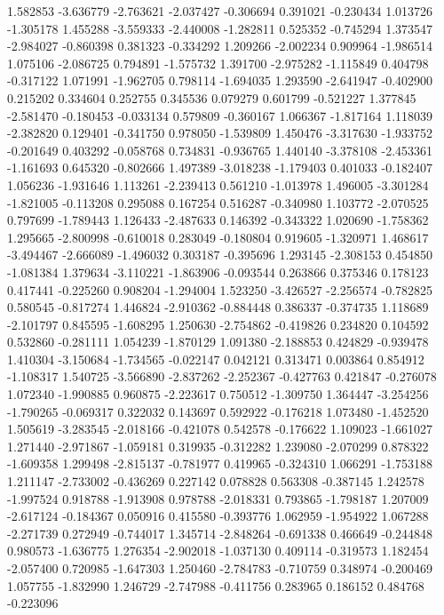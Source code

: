 1.582853
-3.636779
-2.763621
-2.037427
-0.306694
0.391021
-0.230434
1.013726
-1.305178
1.455288
-3.559333
-2.440008
-1.282811
0.525352
-0.745294
1.373547
-2.984027
-0.860398
0.381323
-0.334292
1.209266
-2.002234
0.909964
-1.986514
1.075106
-2.086725
0.794891
-1.575732
1.391700
-2.975282
-1.115849
0.404798
-0.317122
1.071991
-1.962705
0.798114
-1.694035
1.293590
-2.641947
-0.402900
0.215202
0.334604
0.252755
0.345536
0.079279
0.601799
-0.521227
1.377845
-2.581470
-0.180453
-0.033134
0.579809
-0.360167
1.066367
-1.817164
1.118039
-2.382820
0.129401
-0.341750
0.978050
-1.539809
1.450476
-3.317630
-1.933752
-0.201649
0.403292
-0.058768
0.734831
-0.936765
1.440140
-3.378108
-2.453361
-1.161693
0.645320
-0.802666
1.497389
-3.018238
-1.179403
0.401033
-0.182407
1.056236
-1.931646
1.113261
-2.239413
0.561210
-1.013978
1.496005
-3.301284
-1.821005
-0.113208
0.295088
0.167254
0.516287
-0.340980
1.103772
-2.070525
0.797699
-1.789443
1.126433
-2.487633
0.146392
-0.343322
1.020690
-1.758362
1.295665
-2.800998
-0.610018
0.283049
-0.180804
0.919605
-1.320971
1.468617
-3.494467
-2.666089
-1.496032
0.303187
-0.395696
1.293145
-2.308153
0.454850
-1.081384
1.379634
-3.110221
-1.863906
-0.093544
0.263866
0.375346
0.178123
0.417441
-0.225260
0.908204
-1.294004
1.523250
-3.426527
-2.256574
-0.782825
0.580545
-0.817274
1.446824
-2.910362
-0.884448
0.386337
-0.374735
1.118689
-2.101797
0.845595
-1.608295
1.250630
-2.754862
-0.419826
0.234820
0.104592
0.532860
-0.281111
1.054239
-1.870129
1.091380
-2.188853
0.424829
-0.939478
1.410304
-3.150684
-1.734565
-0.022147
0.042121
0.313471
0.003864
0.854912
-1.108317
1.540725
-3.566890
-2.837262
-2.252367
-0.427763
0.421847
-0.276078
1.072340
-1.990885
0.960875
-2.223617
0.750512
-1.309750
1.364447
-3.254256
-1.790265
-0.069317
0.322032
0.143697
0.592922
-0.176218
1.073480
-1.452520
1.505619
-3.283545
-2.018166
-0.421078
0.542578
-0.176622
1.109023
-1.661027
1.271440
-2.971867
-1.059181
0.319935
-0.312282
1.239080
-2.070299
0.878322
-1.609358
1.299498
-2.815137
-0.781977
0.419965
-0.324310
1.066291
-1.753188
1.211147
-2.733002
-0.436269
0.227142
0.078828
0.563308
-0.387145
1.242578
-1.997524
0.918788
-1.913908
0.978788
-2.018331
0.793865
-1.798187
1.207009
-2.617124
-0.184367
0.050916
0.415580
-0.393776
1.062959
-1.954922
1.067288
-2.271739
0.272949
-0.744017
1.345714
-2.848264
-0.691338
0.466649
-0.244848
0.980573
-1.636775
1.276354
-2.902018
-1.037130
0.409114
-0.319573
1.182454
-2.057400
0.720985
-1.647303
1.250460
-2.784783
-0.710759
0.348974
-0.200469
1.057755
-1.832990
1.246729
-2.747988
-0.411756
0.283965
0.186152
0.484768
-0.223096

